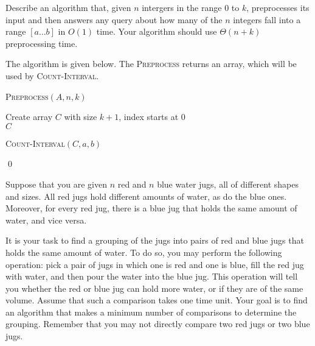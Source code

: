 Describe an algorithm that, given $n$ intergers in the range $0$ to $k$, preprocesses its input and then answers any query about how many of the $n$ integers fall into a range
$[a\ldots b]$ in $O(1)$ time. Your algorithm should use $\Theta(n + k)$ preprocessing time.
\answer

The algorithm is given below. The \textsc{Preprocess} returns an array, which will be used by \textsc{Count-Interval}.

\begin{algorithm}[H]
\caption{\textsc{Preprocess}$(A, n, k)$}
Create array $C$ with size $k + 1$, index starts at $0$\\
\Return $C$
\end{algorithm}

\begin{algorithm}[H]
\caption{\textsc{Count-Interval}$(C, a, b)$}
\end{algorithm}
\qed


Suppose that you are given $n$ red and $n$ blue water jugs, all of different shapes and sizes. All red jugs hold different amounts of water, as do the blue ones. Moreover,
for every red jug, there is a blue jug that holds the same amount of water, and vice versa.

It is your task to find a grouping of the jugs into pairs of red and blue jugs that holds the same amount of water. To do so, you may perform the following operation:
pick a pair of jugs in which one is red and one is blue, fill the red jug with water, and then pour the water into the blue jug. This operation will tell you whether the red or
blue jug can hold more water, or if they are of the same volume. Assume that such a comparison takes one time unit. Your goal is to find an algorithm that makes a minimum number of
comparisons to determine the grouping. Remember that you may not directly compare two red jugs or two blue jugs.


